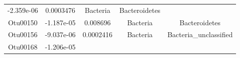 \documentclass[]{article}
\begin{document}
\begin{longtable}[]{@{}ccccc@{}}
\begin{minipage}[t]{0.16\columnwidth}
-2.359e-06\strut
\end{minipage} & \begin{minipage}[t]{0.14\columnwidth}\centering\strut
0.0003476\strut
\end{minipage} & \begin{minipage}[t]{0.13\columnwidth}\centering\strut
Bacteria\strut
\end{minipage} & \begin{minipage}[t]{0.27\columnwidth}\centering\strut
Bacteroidetes\strut
\end{minipage}\tabularnewline
\begin{minipage}[t]{0.13\columnwidth}\centering\strut
Otu00150\strut
\end{minipage} & \begin{minipage}[t]{0.16\columnwidth}\centering\strut
-1.187e-05\strut
\end{minipage} & \begin{minipage}[t]{0.14\columnwidth}\centering\strut
0.008696\strut
\end{minipage} & \begin{minipage}[t]{0.13\columnwidth}\centering\strut
Bacteria\strut
\end{minipage} & \begin{minipage}[t]{0.27\columnwidth}\centering\strut
Bacteroidetes\strut
\end{minipage}\tabularnewline
\begin{minipage}[t]{0.13\columnwidth}\centering\strut
Otu00156\strut
\end{minipage} & \begin{minipage}[t]{0.16\columnwidth}\centering\strut
-9.037e-06\strut
\end{minipage} & \begin{minipage}[t]{0.14\columnwidth}\centering\strut
0.0002416\strut
\end{minipage} & \begin{minipage}[t]{0.13\columnwidth}\centering\strut
Bacteria\strut
\end{minipage} & \begin{minipage}[t]{0.27\columnwidth}\centering\strut
Bacteria\_unclassified\strut
\end{minipage}\tabularnewline
\begin{minipage}[t]{0.13\columnwidth}\centering\strut
Otu00168\strut
\end{minipage} & \begin{minipage}[t]{0.16\columnwidth}\centering\strut
-1.206e-05\strut
\end{minipage} & \begin{minipage}[t]{0.14\columnwidth}\centering\strut

\end{minipage}
\end{longtable}
\end{document}

